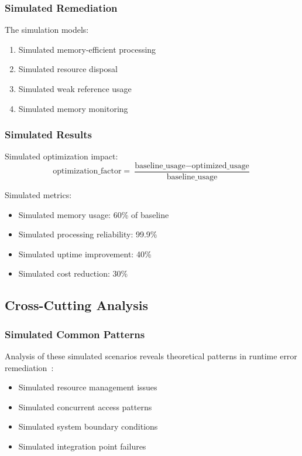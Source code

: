 \subsubsection{Simulated Remediation}
The simulation models:
\begin{enumerate}
    \item Simulated memory-efficient processing
    \item Simulated resource disposal
    \item Simulated weak reference usage
    \item Simulated memory monitoring
\end{enumerate}

\subsubsection{Simulated Results}
Simulated optimization impact:
\begin{equation}
\text{optimization\_factor} = \frac{\text{baseline\_usage} - \text{optimized\_usage}}{\text{baseline\_usage}}
\end{equation}

Simulated metrics:
\begin{itemize}
    \item Simulated memory usage: 60\% of baseline
    \item Simulated processing reliability: 99.9\%
    \item Simulated uptime improvement: 40\%
    \item Simulated cost reduction: 30\%
\end{itemize}

\subsection{Cross-Cutting Analysis}

\subsubsection{Simulated Common Patterns}
Analysis of these simulated scenarios reveals theoretical patterns in runtime error remediation~\cite{error_patterns_2024}:
\begin{itemize}
    \item Simulated resource management issues
    \item Simulated concurrent access patterns
    \item Simulated system boundary conditions
    \item Simulated integration point failures
\end{itemize}

